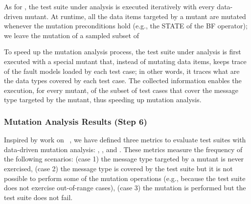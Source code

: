 As for , the test suite under analysis is executed iteratively with every data-driven mutant. 
At runtime, all the data items targeted by a mutant are mutated whenever the mutation preconditions hold (e.g., the STATE of the BF operator); we leave the mutation of a sampled subset of 

To speed up the mutation analysis process, the test suite under analysis is first executed with a special mutant that, instead of mutating data items, keeps trace of the fault models loaded by each test case; in other words, it traces what are the data types covered by each test case. The collected information enables the execution, for every mutant, of the subset of test cases that cover the 
message type
targeted by the mutant, thus speeding up mutation analysis.


\subsubsection{Mutation Analysis Results (Step 6)}
\label{sec:mutationAnalysisResults}

Inspired by work on ~\cite{Offutt2006}, we have defined three metrics to evaluate test suites with data-driven mutation analysis: , , and . 
These metrics measure the frequency of the following scenarios: (case 1) the message type targeted by a mutant is never exercised, (case 2) the message type is covered by the test suite but it is not possible to perform some of the mutation operations (e.g., because the test suite does not exercise out-of-range cases), (case 3) the mutation is performed but the test suite does not fail.

